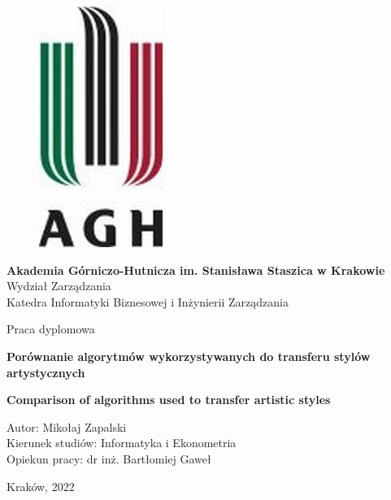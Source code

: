 \documentclass[12pt]{article}
\begin{document}
\begin{figure}[H]
    \centering
	\includegraphics[scale=0.8, trim = 0mm 0mm 0mm 0mm, clip]{logo-agh.jpg}
\end{figure}

\begin{center}
\textbf{Akademia Górniczo-Hutnicza im. Stanisława Staszica w Krakowie}\\
\normalsize{Wydział Zarządzania}\\
\small{Katedra Informatyki Biznesowej i Inżynierii Zarządzania}
\end{center}


\begin{center}
\large{Praca dyplomowa}\\
\end{center}

\begin{center}
\normalsize{\textbf{Porównanie algorytmów wykorzystywanych do transferu stylów artystycznych}}\\    
\end{center}

\begin{center}
\normalsize{\textbf{Comparison of algorithms used to transfer artistic styles}}    
\end{center}

\vfill

\begin{flushleft}
Autor: Mikołaj Zapalski\\
Kierunek studiów: Informatyka i Ekonometria\\
Opiekun pracy: dr inż. Bartłomiej Gaweł
\end{flushleft}

\begin{center}
    Kraków, 2022
\end{center}
\end{document}
